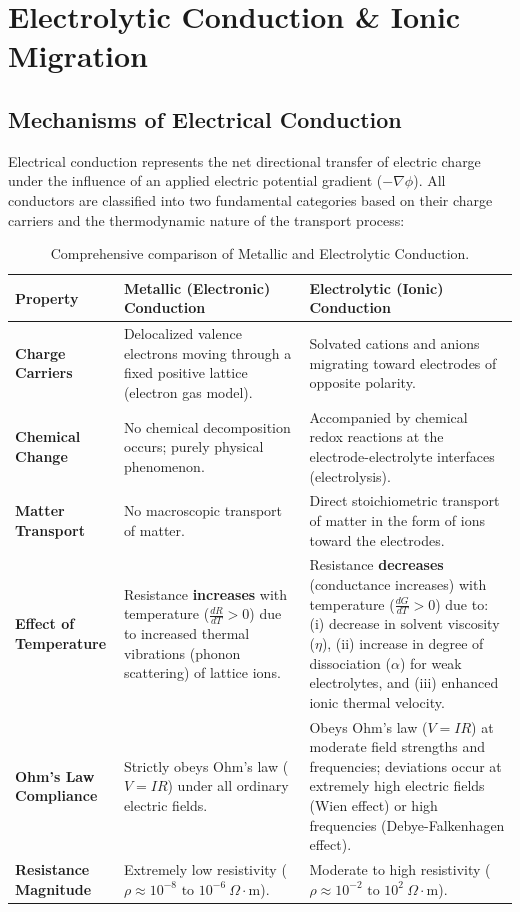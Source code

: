 \chapter{Electrolytic Conduction \& Ionic Migration}
\label{chap:electrolytic_conduction}

\section{Mechanisms of Electrical Conduction}

Electrical conduction represents the net directional transfer of electric charge under the influence of an applied electric potential gradient ($-\nabla \phi$). All conductors are classified into two fundamental categories based on their charge carriers and the thermodynamic nature of the transport process:

\begin{table}[htbp]
\centering
\small
\renewcommand{\arraystretch}{1.3}
\begin{tabularx}{\textwidth}{p{3.2cm}X X}
\toprule
\textbf{Property} & \textbf{Metallic (Electronic) Conduction} & \textbf{Electrolytic (Ionic) Conduction} \\
\midrule
\textbf{Charge Carriers} & Delocalized valence electrons moving through a fixed positive lattice (electron gas model). & Solvated cations and anions migrating toward electrodes of opposite polarity. \\
\textbf{Chemical Change} & No chemical decomposition occurs; purely physical phenomenon. & Accompanied by chemical redox reactions at the electrode-electrolyte interfaces (electrolysis). \\
\textbf{Matter Transport} & No macroscopic transport of matter. & Direct stoichiometric transport of matter in the form of ions toward the electrodes. \\
\textbf{Effect of Temperature} & Resistance \textbf{increases} with temperature ($\frac{dR}{dT} > 0$) due to increased thermal vibrations (phonon scattering) of lattice ions. & Resistance \textbf{decreases} (conductance increases) with temperature ($\frac{dG}{dT} > 0$) due to: (i) decrease in solvent viscosity ($\eta$), (ii) increase in degree of dissociation ($\alpha$) for weak electrolytes, and (iii) enhanced ionic thermal velocity. \\
\textbf{Ohm's Law Compliance} & Strictly obeys Ohm's law ($V = IR$) under all ordinary electric fields. & Obeys Ohm's law ($V = IR$) at moderate field strengths and frequencies; deviations occur at extremely high electric fields (Wien effect) or high frequencies (Debye-Falkenhagen effect). \\
\textbf{Resistance Magnitude} & Extremely low resistivity ($\rho \approx 10^{-8}\text{ to } 10^{-6}\ \Omega\cdot\text{m}$). & Moderate to high resistivity ($\rho \approx 10^{-2}\text{ to } 10^{2}\ \Omega\cdot\text{m}$). \\
\bottomrule
\end{tabularx}
\caption{Comprehensive comparison of Metallic and Electrolytic Conduction.}
\label{tab:metallic_vs_electrolytic}
\end{table}

